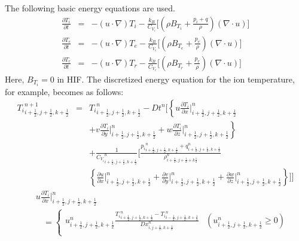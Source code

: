 \begin{enumerate}
The following basic energy equations are used.
\begin{eqnarray}
	\label{eq:EuEoE}
\frac{\partial T_i}{\partial t} &=& - \left( u \cdot \nabla \right) T_i -\frac{k_B}{C_{V_i}} \Biggl[ \left( \rho B_{T_i} + \frac{p_i +q}{\rho} \right) \left( \nabla \cdot u \right)  \Biggr] \\
\frac{\partial T_e}{\partial t} &=& - \left( u \cdot \nabla \right) T_e -\frac{k_B}{C_{V_e}} \Biggl[ \left( \rho B_{T_e} + \frac{p_e}{\rho} \right) \left( \nabla \cdot u \right)  \Biggr] \\
\frac{\partial T_r}{\partial t} &=& - \left( u \cdot \nabla \right) T_r -\frac{k_B}{C_{V_r}} \Biggl[ \left( \rho B_{T_r} + \frac{p_r}{\rho} \right) \left( \nabla \cdot u \right)  \Biggr]
\end{eqnarray}
Here, $B_{T_i} = 0$ in HIF. The discretized energy equation for the ion temperature, for example, becomes as follows: 
\begin{eqnarray}
{T_i}^{n+1}_{i+\frac{1}{2},j+\frac{1}{2},k+\frac{1}{2}} &=& {T_i}^n_{i+\frac{1}{2},j+\frac{1}{2},k+\frac{1}{2}} - Dt^n \Biggl[ \left\{  u \frac{\partial T_i}{\partial x} \bigg|^n_{i+\frac{1}{2},j+\frac{1}{2},k+\frac{1}{2}} \right. \\ \nonumber
&& \left. + v \frac{\partial T_i}{\partial y} \bigg|^n_{i+\frac{1}{2},j+\frac{1}{2},k+\frac{1}{2}} + w \frac{\partial T_i}{\partial z} \bigg|^n_{i+\frac{1}{2},j+\frac{1}{2},k+\frac{1}{2}} \right\} \\ \nonumber
&& + \frac{1}{{C_{V_i}}^n_{i+\frac{1}{2},j+\frac{1}{2},k+\frac{1}{2}}} \Biggl[ \frac{{p_i}^n_{i+\frac{1}{2},j+\frac{1}{2},k+\frac{1}{2}} + q^n_{i+\frac{1}{2},j+\frac{1}{2},k+\frac{1}{2}}}{\rho^n_{i+\frac{1}{2},j+\frac{1}{2}+k\frac{1}{2}}}  \\ \nonumber
&& \left\{ \frac{\partial u}{\partial x} \bigg|^n_{i+\frac{1}{2},j+\frac{1}{2},k+\frac{1}{2}} + \frac{\partial v}{\partial y} \bigg|^n_{i+\frac{1}{2},j+\frac{1}{2},k+\frac{1}{2}}  + \frac{\partial w}{\partial z} \bigg|^n_{i+\frac{1}{2},j+\frac{1}{2},k+\frac{1}{2}} \right\} \Biggr] \Biggr]
\end{eqnarray}
\begin{eqnarray*}
&& u \frac{\partial {T_i}}{\partial x} \bigg|^n_{i+\frac{1}{2},j+\frac{1}{2},k+\frac{1}{2}} \\
&& \ \ \ \  = \left\{ 
\begin{array}{ll}
	u^n_{i+\frac{1}{2},j+\frac{1}{2},k+\frac{1}{2}} \frac{{T_i}^n_{i+\frac{1}{2},j+\frac{1}{2},k+\frac{1}{2}} -  {T_i}^n_{i-\frac{1}{2},j+\frac{1}{2},k+\frac{1}{2}}}{Dx^n_{i,j+\frac{1}{2},k+\frac{1}{2}}} &\left( u^n_{i+\frac{1}{2},j+\frac{1}{2},k+\frac{1}{2}} \geq 0 \right) \\

\end{array}
\end{eqnarray*}
\end{enumerate}
